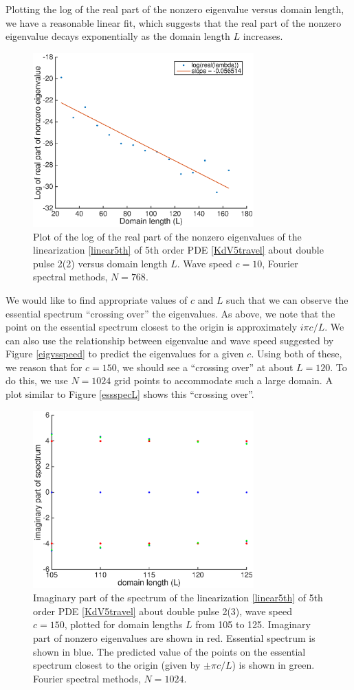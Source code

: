 \documentclass[12pt]{article}
\begin{document}
Plotting the log of the real part of the nonzero eigenvalue versus domain length, we have a reasonable linear fit, which suggests that the real part of the nonzero eigenvalue decays exponentially as the domain length $L$ increases.

\begin{figure}[H]
	\includegraphics[width=8.5cm]{expdecayL}
	\caption{Plot of the log of the real part of the nonzero eigenvalues of the linearization \eqref{linear5th} of 5th order PDE \eqref{KdV5travel} about double pulse 2(2) versus domain length $L$. Wave speed $c = 10$, Fourier spectral methods, $N = 768$.}
\end{figure}

We would like to find appropriate values of $c$ and $L$ such that we can observe the essential spectrum ``crossing over'' the eigenvalues. As above, we note that the point on the essential spectrum closest to the origin is approximately $i \pi c / L$. We can also use the relationship between eigenvalue and wave speed suggested by Figure \ref{eigvsspeed} to predict the eigenvalues for a given $c$. Using both of these, we reason that for $c = 150$, we should see a ``crossing over'' at about $L = 120$. To do this, we use $N = 1024$ grid points to accommodate such a large domain. A plot similar to Figure \ref{essspecL} shows this ``crossing over''.

\begin{figure}[H]
	\includegraphics[width=8.5cm]{crossingover}
	\caption{Imaginary part of the spectrum of the linearization \eqref{linear5th} of 5th order PDE \eqref{KdV5travel} about double pulse 2(3), wave speed $c = 150$, plotted for domain lengths $L$ from 105 to 125. Imaginary part of nonzero eigenvalues are shown in red. Essential spectrum is shown in blue. The predicted value of the points on the essential spectrum closest to the origin (given by $\pm \pi c/L$) is shown in green. Fourier spectral methods, $N = 1024$.}
\end{figure}
\end{document}

